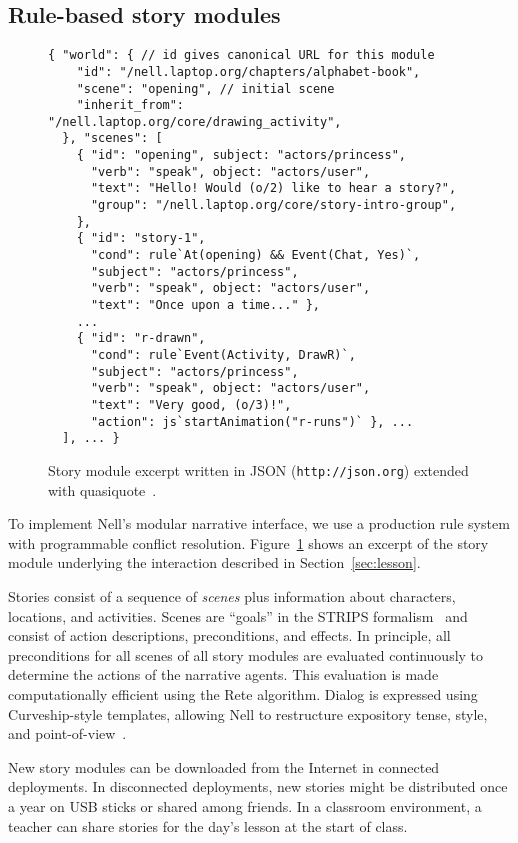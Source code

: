 \documentclass{sig-alternate}
\begin{document}
\subsection{Rule-based story modules}
\begin{figure}\small
\begin{verbatim}
{ "world": { // id gives canonical URL for this module
    "id": "/nell.laptop.org/chapters/alphabet-book",
    "scene": "opening", // initial scene
    "inherit_from": "/nell.laptop.org/core/drawing_activity",
  }, "scenes": [
    { "id": "opening", subject: "actors/princess",
      "verb": "speak", object: "actors/user",
      "text": "Hello! Would (o/2) like to hear a story?",
      "group": "/nell.laptop.org/core/story-intro-group",
    },
    { "id": "story-1",
      "cond": rule`At(opening) && Event(Chat, Yes)`,
      "subject": "actors/princess",
      "verb": "speak", object: "actors/user",
      "text": "Once upon a time..." },
    ...
    { "id": "r-drawn",
      "cond": rule`Event(Activity, DrawR)`,
      "subject": "actors/princess",
      "verb": "speak", object: "actors/user",
      "text": "Very good, (o/3)!",
      "action": js`startAnimation("r-runs")` }, ...
  ], ... }
\end{verbatim}
\caption{Story module excerpt written in JSON
  (\texttt{http://json.org}) extended with
 quasiquote~\cite{quasiquote}.}\label{fig:rules}
\end{figure}
To implement Nell's modular narrative interface, we use a
production rule system with programmable conflict resolution.
Figure~\ref{fig:rules} shows
an excerpt of the story module underlying the interaction described in
Section~\ref{sec:lesson}.

Stories consist of a sequence of \textit{scenes} plus information about
characters, locations, and activities.  Scenes are ``goals''
in the STRIPS formalism~\cite{strips} and consist of
action descriptions, preconditions, and effects.
In principle, all preconditions for all scenes of all story modules
are evaluated continuously to determine the actions of the narrative
agents.  This evaluation
is made computationally efficient using the Rete
algorithm.  Dialog is expressed using Curveship-style
templates, allowing Nell to restructure
expository tense, style, and point-of-view~\cite{montfort:curveship}.


New story modules can be downloaded from the Internet in
connected deployments.  In disconnected deployments, new stories
might be distributed once a year on USB sticks or shared among
friends.  In a classroom environment, a teacher can share stories for
the day's lesson at the start of class.
\end{document}
